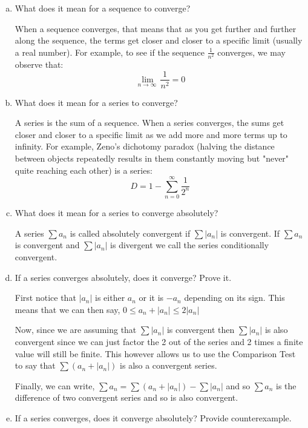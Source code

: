 \documentclass{article}
\begin{document}
\begin{enumerate}[a.]
    \item What does it mean for a sequence to converge?

          When a sequence converges, that means that as you get further and further along the sequence, the terms get closer and closer to a specific limit (usually a real number). For example, to see if the sequence $\frac{1}{n^2}$ converges, we may observe that:
          \[\lim _{n \to \infty \:}\frac{1}{n^2}=0\]

    \item What does it mean for a series to converge?

          A series is the sum of a sequence. When a series converges, the sums get closer and closer to a specific limit as we add more and more terms up to infinity. For example, Zeno's dichotomy paradox (halving the distance between objects repeatedly results in them constantly moving but "never" quite reaching each other) is a series:
          \[D = 1 - \sum_{n=0}^{\infty}\frac{1}{2^n}\]

    \item What does it mean for a series to converge absolutely?

          A series $\sum a_n$ is called absolutely convergent if $\sum |a_n|$ is convergent. If $\sum a_n$ is convergent and $\sum |a_n|$ is divergent we call the series conditionally convergent.

    \item If a series converges absolutely, does it converge? Prove it.

          First notice that $|a_n|$ is either $a_n$ or it is $-a_n$ depending on its sign. This means that we can then say, $0 \leq a_n + |a_n| \leq 2|a_n|$

          Now, since we are assuming that $\sum |a_n| $ is convergent then $\sum |a_n| $ is also convergent since we can just factor the 2 out of the series and 2 times a finite value will still be finite. This however allows us to use the Comparison Test to say that $\sum(a_n + |a_n|)$ is also a convergent series.

          Finally, we can write, $\sum a_n = \sum(a_n + |a_n|) - \sum |a_n|$ and so $\sum a_n$ is the difference of two convergent series and so is also convergent.

    \item If a series converges, does it converge absolutely? Provide counterexample.


\end{enumerate}
\end{document}
